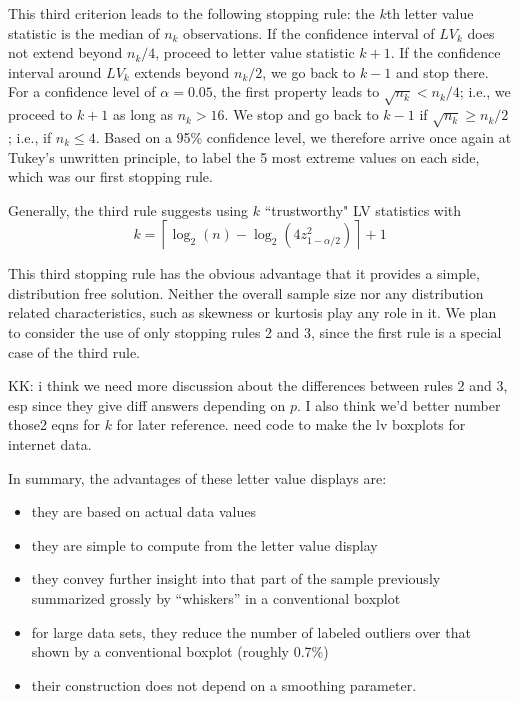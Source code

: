 \documentclass[11pt]{article}
\begin{document}
This third criterion leads to the following stopping rule: 
the $k$th letter value statistic is the median of $n_k$ observations. 
If the confidence interval of $LV_k$ does not extend beyond $n_k/4$, 
proceed to letter value statistic $k+1$. 
If the confidence interval around $LV_k$ extends beyond $n_k/2$, 
we go back to $k-1$ and stop there.
For a  confidence level of $\alpha= 0.05$, the first property 
leads to $\sqrt{n_k} < n_k/4$; i.e., we proceed to $k+1$ as long as 
$n_k > 16$. 
We stop and go back to $k-1$ if  $\sqrt{n_k} \ge n_k/2$; i.e., if $n_k \le 4$. 
Based on a 95\% confidence level, we therefore arrive once again
at Tukey's unwritten principle, to label the 5 most extreme values 
on each side, which was our first stopping rule.

Generally, the third rule suggests using $k$  ``trustworthy" LV 
statistics with
\[
k =  \left \lceil \log_2 (n) - \log_2 \left(4  z_{1-\alpha/2}^2 \right) \right \rceil + 1
\]

This third stopping rule has the obvious advantage that it provides a 
simple, distribution free solution. Neither the overall sample size 
nor any distribution related characteristics, such as skewness or 
kurtosis play any role in it. 
We plan to consider the use of only stopping rules 2 and 3,
since the first rule is a special case of the third rule.

KK: i think we need more discussion about the differences 
between rules 2 and 3, esp since they give diff answers
depending on $p$.
I also think we'd better number those2 eqns for $k$ for 
later reference.
need code to make the lv boxplots for internet data.

In summary, the advantages of these letter value displays are:

\begin{itemize}
\item 
they are based on actual data values 
\item
they are simple to compute from the letter value display
\item 
they convey further insight into 
that part of the sample previously summarized grossly
by ``whiskers'' in a conventional boxplot
\item
for large data sets,
they reduce the number of labeled outliers over
that shown by a conventional boxplot (roughly 0.7\%)
\item their construction does not depend on a smoothing parameter.
\end{itemize} 
\end{document}
